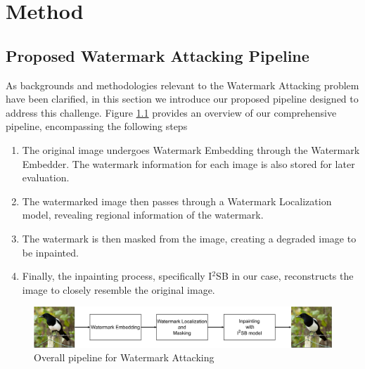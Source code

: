 \chapter{Method}
\label{chapter:method}
\thispagestyle{empty}
\section{Proposed Watermark Attacking Pipeline}
\label{sec:pipeline}
As backgrounds and methodologies relevant to the Watermark Attacking problem have been clarified, in this section we introduce our proposed pipeline designed to address this challenge. Figure \ref{figure:overall_pipeline} provides an overview of our comprehensive pipeline, encompassing the following steps
\begin{enumerate}
 \item The original image undergoes Watermark Embedding through the Watermark Embedder. The watermark information for each image is also stored for later evaluation.
 \item The watermarked image then passes through a Watermark Localization model, revealing regional information of the watermark.
 \item The watermark is then masked from the image, creating a degraded image to be inpainted.
 \item Finally, the inpainting process, specifically I$^2$SB in our case, reconstructs the image to closely resemble the original image.
\end{enumerate}
\begin{figure}[H]
 \centering
 \includegraphics[width = \textwidth]{img/overall.png}
 \vspace{0.5cm}
 \caption{Overall pipeline for Watermark Attacking}
 \label{figure:overall_pipeline}
\end{figure}

%     

%     
